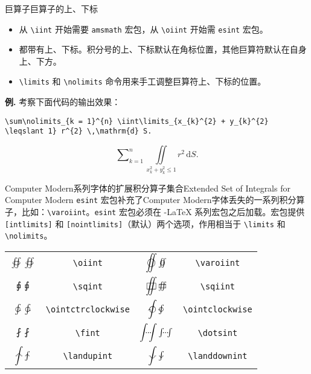 \documentclass[mathserif]{beamer}
\newcommand{\codegreen}[1]{\textcolor{codegreen}{#1}}
\newenvironment{instance}{\zihao{-5}\textbf{\songti \codegreen{例.}}}{\hfill\par}
\begin{document}
\begin{frame}[fragile]{巨算子}{巨算子的上、下标}
\begin{itemize}

\item 从 \lstinline'\iint' 开始需要 \verb'amsmath' 宏包，从 \lstinline'\oiint' 开始需 \verb'esint' 宏包。

\item 都带有上、下标。积分号的上、下标默认在角标位置，其他巨算符默认在自身上、下方。

\item \lstinline'\limits' 和 \lstinline'\nolimits' 命令用来手工调整巨算符上、下标的位置。

\end{itemize}

\begin{instance}
考察下面代码的输出效果：
\begin{lstlisting}[numbers=none]
	\sum\nolimits_{k = 1}^{n} \iint\limits_{x_{k}^{2} + y_{k}^{2} \leqslant 1} r^{2} \,\mathrm{d} S.
\end{lstlisting}%
\noindent
\begin{equation*}
	\sum\nolimits_{k = 1}^{n} \iint\limits_{x_{k}^{2} + y_{k}^{2} \leqslant 1} r^{2} \,\mathrm{d} S.
\end{equation*}
\end{instance}
\end{frame}

\begin{frame}[fragile]{Computer Modern系列字体的扩展积分算子集合}{Extended Set of Integrals for Computer Modern}
\verb'esint' 宏包补充了Computer Modern字体丢失的一系列积分算子，比如：\lstinline'\varoiint'。{\color{red}\verb'esint' 宏包必须在 \AmS-\LaTeX{} 系列宏包之后加载。}宏包提供 \lstinline'[intlimits]' 和 \lstinline'[nointlimits]'（默认）两个选项，作用相当于 \lstinline'\limits' 和 \lstinline'\nolimits'。\cite{esint}
\begin{table}[H]
\centering
\begin{tabular}{cc|cc}
	\toprule
	$\displaystyle \oiint \textstyle \oiint$ & \lstinline'\oiint' & $\displaystyle \varoiint \textstyle \varoiint$ & \lstinline'\varoiint' \\
	$\displaystyle \sqint \textstyle \sqint$ & \lstinline'\sqint' & $\displaystyle \sqiint \textstyle \sqiint$ & \lstinline'\sqiint' \\
	$\displaystyle \ointctrclockwise \textstyle \ointctrclockwise$ & \lstinline'\ointctrclockwise' & $\displaystyle \ointclockwise \textstyle \ointclockwise$ & \lstinline'\ointclockwise' \\
	$\displaystyle \fint \textstyle \fint$ & \lstinline'\fint' & $\displaystyle \dotsint \textstyle \dotsint$ & \lstinline'\dotsint' \\
	$\displaystyle \landupint \textstyle \landupint$ & \lstinline'\landupint' & $\displaystyle \landdownint \textstyle \landdownint$ & \lstinline'\landdownint' \\
	\bottomrule
\end{tabular}
\end{table}
\end{frame}
\end{document}
